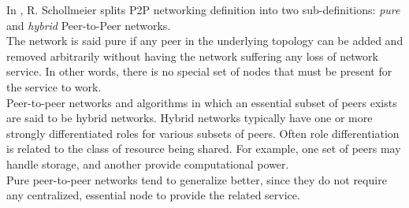 In \cite{Schollmeier:2001:DPN:882470.883282}, R. Schollmeier splits P2P networking
definition into two sub-definitions: \textit{pure} and \textit{hybrid} Peer-to-Peer networks.\\ 
The network is said pure if any peer in the underlying topology can be added and removed arbitrarily without having the network suffering any loss of network service. In other words, there is no special set of nodes that must be present for the service to work. \\
Peer-to-peer networks and algorithms in which an essential subset of peers exists are said to be hybrid networks. Hybrid networks typically have one or more strongly differentiated roles for various subsets of peers. Often role differentiation is related to the class of resource being shared. For example, one set of peers may handle storage, and another provide computational power. \\
Pure peer-to-peer networks tend to generalize better, since they do not require any centralized, essential node to provide the related service.


